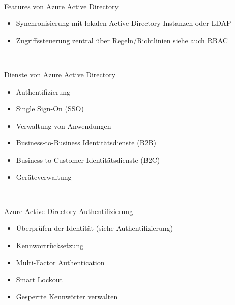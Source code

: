 \documentclass{scrartcl}
\newenvironment{flashcard}[2][]{%
    #1
    \vfill
    \centerline{\Large{#2}}
    \vfill
\newpage
}
{\newpage}
\begin{document}
    \begin{flashcard}[\ ]{Features von Azure Active Directory}
        \begin{itemize}
            \item Synchronisierung mit lokalen Active Directory-Instanzen oder LDAP
            \item Zugriffssteuerung zentral über Regeln/Richtlinien\newline
            siehe auch RBAC
        \end{itemize}
    \end{flashcard}

    \begin{flashcard}[\ ]{Dienste von Azure Active Directory}
        \begin{itemize}
            \item Authentifizierung
            \item Single Sign-On (SSO)
            \item Verwaltung von Anwendungen
            \item Business-to-Business Identitätsdienste (B2B)
            \item Business-to-Customer Identitätsdienste (B2C)
            \item Geräteverwaltung
        \end{itemize}
    \end{flashcard}

    \begin{flashcard}[\ ]{Azure Active Directory-Authentifizierung}
        \begin{itemize}
            \item Überprüfen der Identität
\newline(siehe Authentifizierung)
            \item Kennwortrücksetzung
            \item Multi-Factor Authentication
            \item Smart Lockout
            \item Gesperrte Kennwörter verwalten
        \end{itemize}
    \end{flashcard}
\end{document}
